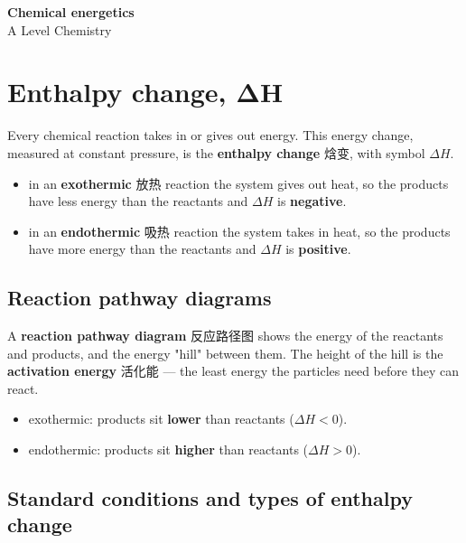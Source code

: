 \documentclass[11pt]{article}
\begin{document}
\begin{center}
  {\LARGE\bfseries Chemical energetics}\\[0.35em]
  {\large A Level Chemistry}
\end{center}
\vspace{0.6em}

\section*{Enthalpy change, ΔH}

Every chemical reaction takes in or gives out energy. This energy change, measured at constant pressure, is the \textbf{enthalpy change} 焓变, with symbol $\Delta H$.

\begin{itemize}
\item in an \textbf{exothermic} 放热 reaction the system gives out heat, so the products have less energy than the reactants and $\Delta H$ is \textbf{negative}.

\item in an \textbf{endothermic} 吸热 reaction the system takes in heat, so the products have more energy than the reactants and $\Delta H$ is \textbf{positive}.

\end{itemize}

\subsection*{Reaction pathway diagrams}

A \textbf{reaction pathway diagram} 反应路径图 shows the energy of the reactants and products, and the energy "hill" between them. The height of the hill is the \textbf{activation energy} 活化能 — the least energy the particles need before they can react.

\begin{itemize}
\item exothermic: products sit \textbf{lower} than reactants ($\Delta H < 0$).

\item endothermic: products sit \textbf{higher} than reactants ($\Delta H > 0$).

\end{itemize}

\subsection*{Standard conditions and types of enthalpy change}
\end{document}
